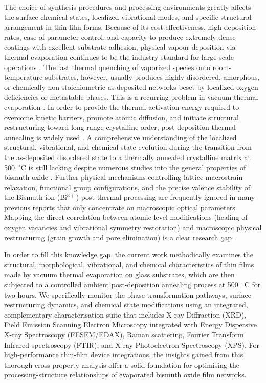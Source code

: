 \documentclass[10pt]{NSP1}
\begin{document}
The choice of synthesis procedures and processing environments greatly affects the surface chemical states, localized vibrational modes, and specific structural arrangement in thin-film forms. Because of its cost-effectiveness, high deposition rates, ease of parameter control, and capacity to produce extremely dense coatings with excellent substrate adhesion, physical vapour deposition via thermal evaporation continues to be the industry standard for large-scale operations \cite{R5}. The fast thermal quenching of vaporized species onto room-temperature substrates, however, usually produces highly disordered, amorphous, or chemically non-stoichiometric as-deposited networks beset by localized oxygen deficiencies or metastable phases. This is a recurring problem in vacuum thermal evaporation \cite{R6,R7}. In order to provide the thermal activation energy required to overcome kinetic barriers, promote atomic diffusion, and initiate structural restructuring toward long-range crystalline order, post-deposition thermal annealing is widely used \cite{R8,R9}. A comprehensive understanding of the localized structural, vibrational, and chemical state evolution during the transition from the as-deposited disordered state to a thermally annealed crystalline matrix at 500~$^\circ$C is still lacking despite numerous studies into the general properties of bismuth oxide \cite{R10,R11}. Further physical mechanisms controlling lattice macrostrain relaxation, functional group configurations, and the precise valence stability of the Bismuth ion (Bi$^{3+}$) post-thermal processing are frequently ignored in many previous reports that only concentrate on macroscopic optical parameters. Mapping the direct correlation between atomic-level modifications (healing of oxygen vacancies and vibrational symmetry restoration) and macroscopic physical restructuring (grain growth and pore elimination) is a clear research gap \cite{R12,R13}.

In order to fill this knowledge gap, the current work methodically examines the structural, morphological, vibrational, and chemical characteristics of thin films made by vacuum thermal evaporation on glass substrates, which are then subjected to a controlled ambient post-deposition annealing process at 500~$^\circ$C for two hours. We specifically monitor the phase transformation pathways, surface restructuring dynamics, and chemical state modifications using an integrated, complementary characterisation suite that includes X-ray Diffraction (XRD), Field Emission Scanning Electron Microscopy integrated with Energy Dispersive X-ray Spectroscopy (FESEM/EDAX), Raman scattering, Fourier Transform Infrared spectroscopy (FTIR), and X-ray Photoelectron Spectroscopy (XPS). For high-performance thin-film device integrations, the insights gained from this thorough cross-property analysis offer a solid foundation for optimising the processing-structure relationships of evaporated bismuth oxide film networks.
\end{document}
